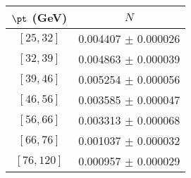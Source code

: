 \begin{tabular}{c||c}
$\pt$ (GeV) & $N$  \\
\hline
$[25, 32]$ & 0.004407 $\pm$ 0.000026\\
$[32, 39]$ & 0.004863 $\pm$ 0.000039\\
$[39, 46]$ & 0.005254 $\pm$ 0.000056\\
$[46, 56]$ & 0.003585 $\pm$ 0.000047\\
$[56, 66]$ & 0.003313 $\pm$ 0.000068\\
$[66, 76]$ & 0.001037 $\pm$ 0.000032\\
$[76, 120]$ & 0.000957 $\pm$ 0.000029\\
\end{tabular}
